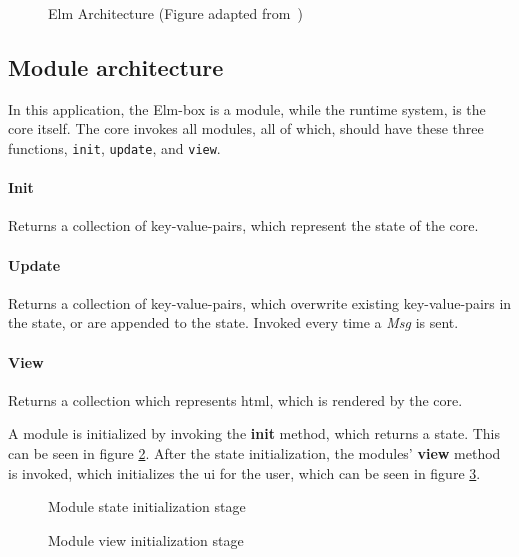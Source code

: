 \begin{figure}
  \centering
  
  \caption{Elm Architecture (Figure adapted from~\cite{elmFig})}
  \label{fig:elmArchitecture}
\end{figure}

\subsection{Module architecture}

In this application, the Elm-box is a module, while the runtime system, is the
core itself. The core invokes all modules, all of which, should have these three
functions, \lstinline{init}, \lstinline{update}, and \lstinline{view}.

\paragraph{Init} Returns a collection of key-value-pairs, which represent
the state of the core.

\paragraph{Update} Returns a collection of key-value-pairs, which
overwrite existing key-value-pairs in the state, or are appended to the state.
Invoked every time a \textit{Msg} is sent.

\paragraph{View} Returns a collection which represents \gls*{html},
which is rendered by the core.

A module is initialized by invoking the \textbf{init} method, which returns a
state. This can be seen in figure \ref{fig:moduleInit}. After the state
initialization, the modules' \textbf{view} method is invoked, which initializes
the \gls*{ui} for the user, which can be seen in figure \ref{fig:moduleInitView}.

\begin{figure}
  \centering
  
  \caption{Module state initialization stage}
  \label{fig:moduleInit}
\end{figure}

\begin{figure}
  \centering
  
  \caption{Module view initialization stage}
  \label{fig:moduleInitView}
\end{figure}

